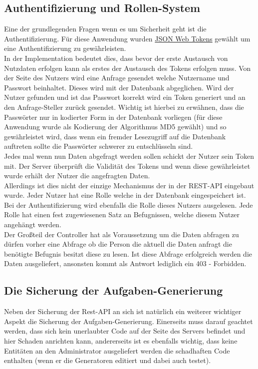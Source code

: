 \subsection{Authentifizierung und Rollen-System}

Eine der grundlegenden Fragen wenn es um Sicherheit geht ist die Authentifizierung. Für diese Anwendung wurden \hyperref[JWT]{JSON Web Tokens} gewählt um eine Authentifizierung zu gewährleisten. \\
In der Implementation bedeutet dies, dass bevor der erste Austausch von Nutzdaten erfolgen kann als erstes der Austausch des Tokens erfolgen muss. Von der Seite des Nutzers wird eine Anfrage gesendet welche Nutzername und Passwort beinhaltet. Dieses wird mit der Datenbank abgeglichen. Wird der Nutzer gefunden und ist das Passwort korrekt wird ein Token generiert und an den Anfrage-Steller zurück gesendet. Wichtig ist hierbei zu erwähnen, dass die Passwörter nur in kodierter Form in der Datenbank vorliegen (für diese Anwendung wurde als Kodierung der Algorithmus MD5 gewählt) und so gewährleistet wird, dass wenn ein fremder Lesezugriff auf die Datenbank auftreten sollte die Passwörter schwerer zu entschlüsseln sind. \\
Jedes mal wenn nun Daten abgefragt werden sollen schickt der Nutzer sein Token mit. Der Server überprüft die Validität des Tokens und wenn diese gewährleistet wurde erhält der Nutzer die angefragten Daten. \\

Allerdings ist dies nicht der einzige Mechanismus der in der REST-API eingebaut wurde. Jeder Nutzer hat eine Rolle welche in der Datenbank eingespeichert ist. Bei der Authentifizierung wird ebenfalls die Rolle dieses Nutzers ausgelesen. Jede Rolle hat einen fest zugewiesenen Satz an Befugnissen, welche diesem Nutzer angehängt werden. \\
Der Großteil der Controller hat als Voraussetzung um die Daten abfragen zu dürfen vorher eine Abfrage ob die Person die aktuell die Daten anfragt die benötigte Befugnis besitzt diese zu lesen. Ist diese Abfrage erfolgreich werden die Daten ausgeliefert, ansonsten kommt als Antwort lediglich ein 403 - Forbidden.

\subsection{Die Sicherung der Aufgaben-Generierung}\label{GenerateTaskChapter}

Neben der Sicherung der Rest-API an sich ist natürlich ein weiterer wichtiger Aspekt die Sicherung der Aufgaben-Generierung. Einerseits muss darauf geachtet werden, dass sich kein unerlaubter Code auf der Seite des Servers befindet und hier Schaden anrichten kann, andererseits ist es ebenfalls wichtig, dass keine Entitäten an den Administrator ausgeliefert werden die schadhaften Code enthalten (wenn er die Generatoren editiert und dabei auch testet). \\


